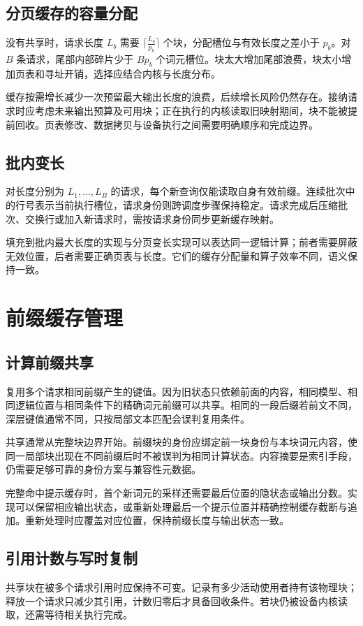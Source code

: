 \documentclass[../textbook.tex]{subfiles}
\begin{document}
\subsection{分页缓存的容量分配}
没有共享时，请求长度 $L_b$ 需要 $\lceil \frac{L_b}{p_b}\rceil$ 个块，分配槽位与有效长度之差小于 $p_b$。对 $B$ 条请求，尾部内部碎片少于 $Bp_b$ 个词元槽位。块太大增加尾部浪费，块太小增加页表和寻址开销，选择应结合内核与长度分布。

缓存按需增长减少一次预留最大输出长度的浪费，后续增长风险仍然存在。接纳请求时应考虑未来输出预算及可用块；正在执行的内核读取旧映射期间，块不能被提前回收。页表修改、数据拷贝与设备执行之间需要明确顺序和完成边界。

\subsection{批内变长}
对长度分别为 $L_1,\ldots,L_B$ 的请求，每个新查询仅能读取自身有效前缀。连续批次中的行号表示当前执行槽位，请求身份则跨调度步骤保持稳定。请求完成后压缩批次、交换行或加入新请求时，需按请求身份同步更新缓存映射。

填充到批内最大长度的实现与分页变长实现可以表达同一逻辑计算；前者需要屏蔽无效位置，后者需要正确页表与长度。它们的缓存分配量和算子效率不同，语义保持一致。

\section{前缀缓存管理}

\subsection{计算前缀共享}
复用多个请求相同前缀产生的键值。因为旧状态只依赖前面的内容，相同模型、相同逻辑位置与相同条件下的精确词元前缀可以共享。相同的一段后缀若前文不同，深层键值通常不同，只按局部文本匹配会误判复用条件。

共享通常从完整块边界开始。前缀块的身份应绑定前一块身份与本块词元内容，使同一局部块出现在不同前缀后时不被误判为相同计算状态。内容摘要是索引手段，仍需要足够可靠的身份方案与兼容性元数据。

完整命中提示缓存时，首个新词元的采样还需要最后位置的隐状态或输出分数。实现可以保留相应输出状态，或重新处理最后一个提示位置并精确控制缓存截断与追加。重新处理时应覆盖对应位置，保持前缀长度与输出状态一致。

\subsection{引用计数与写时复制}
共享块在被多个请求引用时应保持不可变。记录有多少活动使用者持有该物理块；释放一个请求只减少其引用，计数归零后才具备回收条件。若块仍被设备内核读取，还需等待相关执行完成。
\end{document}
